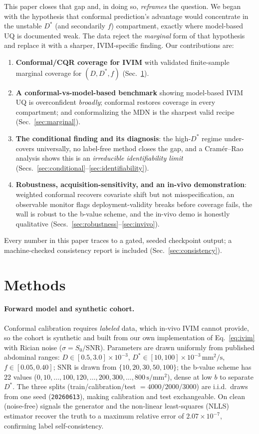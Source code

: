 \documentclass[11pt]{article}
\newcommand{\Dstar}{D^{*}}
\newcommand{\unit}[1]{\,\mathrm{#1}}
\begin{document}
This paper closes that gap and, in doing so, \emph{reframes} the question. We began
with the hypothesis that conformal prediction's advantage would concentrate in the
unstable $\Dstar$ (and secondarily $f$) compartment, exactly where model-based UQ
is documented weak. The data reject the \emph{marginal} form of that hypothesis and
replace it with a sharper, IVIM-specific finding. Our contributions are:
\begin{enumerate}
\item \textbf{Conformal/CQR coverage for IVIM} with validated finite-sample
marginal coverage for $(D,\Dstar,f)$ (Sec.~\ref{sec:methods}).
\item \textbf{A conformal-vs-model-based benchmark} showing model-based IVIM UQ is
overconfident \emph{broadly}; conformal restores coverage in every compartment;
and conformalizing the MDN is the sharpest valid recipe (Sec.~\ref{sec:marginal}).
\item \textbf{The conditional finding and its diagnosis}: the high-$\Dstar$ regime
under-covers universally, no label-free method closes the gap, and a
Cram\'er--Rao analysis shows this is an \emph{irreducible identifiability limit}
(Secs.~\ref{sec:conditional}--\ref{sec:identifiability}).
\item \textbf{Robustness, acquisition-sensitivity, and an in-vivo demonstration}:
weighted conformal recovers covariate shift but not misspecification, an observable
monitor flags deployment-validity breaks before coverage fails, the wall is robust
to the b-value scheme, and the in-vivo demo is honestly qualitative
(Secs.~\ref{sec:robustness}--\ref{sec:invivo}).
\end{enumerate}
Every number in this paper traces to a gated, seeded checkpoint output; a
machine-checked consistency report is included (Sec.~\ref{sec:consistency}).

\section{Methods}
\label{sec:methods}

\paragraph{Forward model and synthetic cohort.}
Conformal calibration requires \emph{labeled} data, which in-vivo IVIM cannot
provide, so the cohort is synthetic and built from our own implementation of
Eq.~\eqref{eq:ivim} with Rician noise ($\sigma = S_0/\mathrm{SNR}$). Parameters are
drawn uniformly from published abdominal ranges: $D\in[0.5,3.0]\times10^{-3}$,
$\Dstar\in[10,100]\times10^{-3}\unit{mm^2/s}$, $f\in[0.05,0.40]$; SNR is drawn from
$\{10,20,30,50,100\}$; the b-value scheme has 22 values
($0,10,\dots,100,120,\dots,200,300,\dots,800\unit{s/mm^2}$), dense at low $b$ to
separate $\Dstar$. The three splits (train/calibration/test $=4000/2000/3000$) are
i.i.d.\ draws from one seed (\texttt{20260613}), making calibration and test
exchangeable. On clean (noise-free) signals the generator and the non-linear
least-squares (NLLS) estimator recover the truth to a maximum relative error of
$2.07\times10^{-7}$, confirming label self-consistency.
\end{document}
